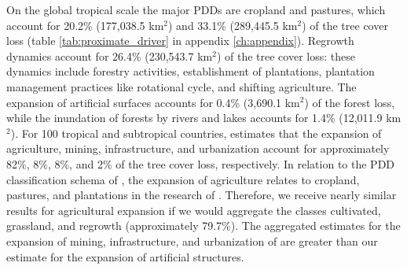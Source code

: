 			On the global tropical scale the major \acp{PDD} are cropland and pastures, which account for 20.2\% (177,038.5 km$^2$) and 33.1\% (289,445.5 km$^2$) of the tree cover loss (table \ref{tab:proximate_driver} in appendix \ref{ch:appendix}). Regrowth dynamics account for 26.4\% (230,543.7 km$^2$) of the tree cover loss: these dynamics include forestry activities, establishment of plantations, plantation management practices like rotational cycle, and shifting agriculture. The expansion of artificial surfaces accounts for 0.4\% (3,690.1 km$^2$) of the forest loss, while the inundation of forests by rivers and lakes accounts for 1.4\% (12,011.9 km$^2$). For 100 tropical and subtropical countries, \citet{Hosonuma2012} estimates that the expansion of agriculture, mining, infrastructure, and urbanization account for approximately 82\%, 8\%, 8\%, and 2\% of the tree cover loss, respectively. In relation to the \ac{PDD} classification schema of \citet{Geist2001}, the expansion of agriculture relates to cropland, pastures, and plantations in the research of \citet{Hosonuma2012}. Therefore, we receive nearly similar results for agricultural expansion if we would aggregate the classes cultivated, grassland, and regrowth (approximately 79.7\%). The aggregated estimates for the expansion of mining, infrastructure, and urbanization of \citet{Hosonuma2012} are greater than our estimate for the expansion of artificial structures.

